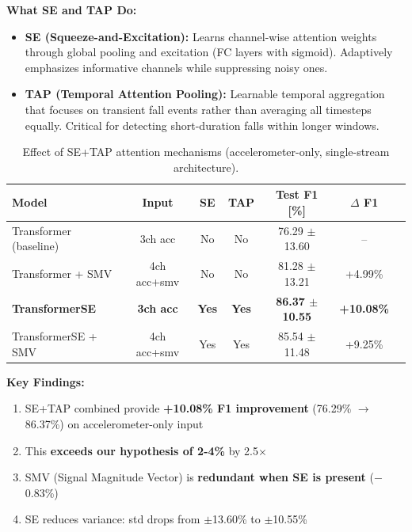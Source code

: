 \documentclass{article}
\begin{document}
\textbf{What SE and TAP Do:}
\begin{itemize}
    \item \textbf{SE (Squeeze-and-Excitation):} Learns channel-wise attention weights through global pooling and excitation (FC layers with sigmoid). Adaptively emphasizes informative channels while suppressing noisy ones.
    \item \textbf{TAP (Temporal Attention Pooling):} Learnable temporal aggregation that focuses on transient fall events rather than averaging all timesteps equally. Critical for detecting short-duration falls within longer windows.
\end{itemize}

\begin{table}[htbp]
    \centering
    \caption{Effect of SE+TAP attention mechanisms (accelerometer-only, single-stream architecture).}
    \label{tab:se_ablation}
    \begin{tabular}{lcccccc}
        \toprule
        \textbf{Model} & \textbf{Input} & \textbf{SE} & \textbf{TAP} & \textbf{Test F1 [\%]} & \textbf{$\Delta$ F1} \\
        \midrule
        Transformer (baseline) & 3ch acc & No & No & 76.29 $\pm$ 13.60 & -- \\
        Transformer + SMV & 4ch acc+smv & No & No & 81.28 $\pm$ 13.21 & +4.99\% \\
        \textbf{TransformerSE} & \textbf{3ch acc} & \textbf{Yes} & \textbf{Yes} & \textbf{86.37 $\pm$ 10.55} & \textbf{+10.08\%} \\
        TransformerSE + SMV & 4ch acc+smv & Yes & Yes & 85.54 $\pm$ 11.48 & +9.25\% \\
        \bottomrule
    \end{tabular}
\end{table}

\textbf{Key Findings:}
\begin{enumerate}
    \item SE+TAP combined provide \textbf{+10.08\% F1 improvement} (76.29\% $\rightarrow$ 86.37\%) on accelerometer-only input
    \item This \textbf{exceeds our hypothesis of 2-4\%} by 2.5$\times$
    \item SMV (Signal Magnitude Vector) is \textbf{redundant when SE is present} ($-$0.83\%)
    \item SE reduces variance: std drops from $\pm$13.60\% to $\pm$10.55\%
\end{enumerate}
\end{document}
